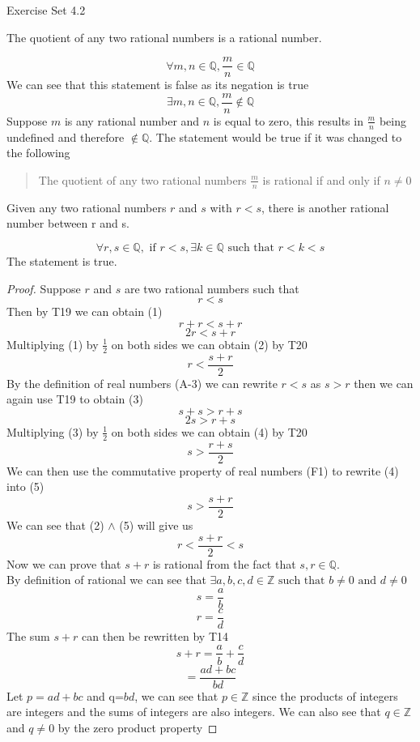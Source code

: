 \documentclass[12pt,letterpaper, onecolumn]{exam}
\begin{document}
	\pagebreak
	\centering\large Exercise Set 4.2\\
	\begin{questions}
		\setcounter{question}{15} \question The quotient of any two rational numbers is a rational number.
		\begin{solution}
			$$\forall m,n \in \mathbb{Q}, \frac{m}{n} \in \mathbb{Q}$$
			We can see that this statement is false as its negation is true
			$$\exists m,n \in \mathbb{Q}, \frac{m}{n} \notin \mathbb{Q}$$
			Suppose $m$ is any rational number and $n$ is equal to zero, this results in $\frac{m}{n}$ being undefined and therefore $\notin \mathbb{Q}$.
			The statement would be true if it was changed to the following
			\begin{quote}
				The quotient of any two rational numbers $\frac{m}{n}$ is rational if and only if $n\neq 0$
			\end{quote}
		\end{solution}
		\setcounter{question}{19} \question Given any two rational numbers $r$ and $s$ with $r<s$, there is another rational number between r and s.
		\begin{solution}
			$$\forall r,s \in \mathbb{Q}, \textrm{ if } r<s, \exists k \in \mathbb{Q} \textrm{ such that } r<k<s$$
			The statement is true.
			\begin{proof}
				Suppose $r$ and $s$ are two rational numbers such that 
				$$r<s$$
				Then by T19 we can obtain (1)
				\[r+r<s+r\]
				\[2r<s+r\tag{1}\]
				Multiplying (1) by $\frac{1}{2}$ on both sides we can obtain (2) by T20
				\[r<\frac{s+r}{2}\tag{2}\]
				By the definition of real numbers (A-3) we can rewrite $r<s$ as $s>r$ then we can again use T19 to obtain (3) 
				\[s+s>r+s\]
				\[2s>r+s\tag{3}\]
				Multiplying (3) by $\frac{1}{2}$ on both sides we can obtain (4) by T20
				\[s>\frac{r+s}{2}\tag{4}\]
				We can then use the commutative property of real numbers (F1) to rewrite (4) into (5)
				\[s>\frac{s+r}{2}\tag{5}\]
				We can see that (2) $\land$ (5) will give us
				\[r<\frac{s+r}{2}<s\tag{6}\]
				Now we can prove that $s+r$ is rational from the fact that $s,r \in \mathbb{Q}$.\\ By definition of rational we can see that $\exists a,b,c,d \in \mathbb{Z} \textrm{ such that } b \neq 0 \textrm{ and } d\neq0$
				$$s=\frac{a}{b}$$
				$$r=\frac{c}{d}$$
				The sum $s+r$ can then be rewritten by T14
				$$s+r=\frac{a}{b}+\frac{c}{d}$$
				$$=\frac{ad+bc}{bd}$$
				Let $p=ad+bc$ and q=$bd$, we can see that $p\in\mathbb{Z}$ since the products of integers are integers and the sums of integers are also integers. We can also see that $q \in\mathbb{Z}$ and $q\neq0$ by the zero product property

\end{proof}
\end{solution}
\end{questions}
\end{document}
